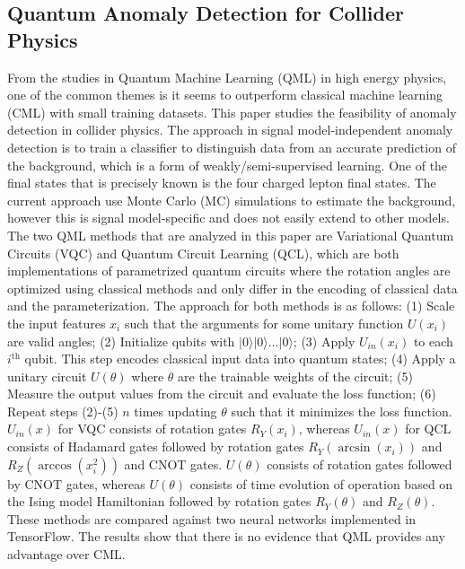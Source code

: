 \subsection{Quantum Anomaly Detection for Collider Physics~\cite{Alvi:2022fkk}}
From the studies in Quantum Machine Learning (QML) in high energy physics, one of the common themes is it seems to outperform classical machine learning (CML) with small training datasets. This paper studies the feasibility of anomaly detection in collider physics. The approach in signal model-independent anomaly detection is to train a classifier to distinguish data from an accurate prediction of the background, which is a form of weakly/semi-supervised learning. One of the final states that is precisely known is the four charged lepton final states. The current approach use Monte Carlo (MC) simulations to estimate the background, however this is signal model-specific and does not easily extend to other models. The two QML methods that are analyzed in this paper are Variational Quantum Circuits (VQC) and Quantum Circuit Learning (QCL), which are both implementations of parametrized quantum circuits where the rotation angles are optimized using classical methods and only differ in the encoding of classical data and the parameterization. The approach for both methods is as follows: (1) Scale the input features $x_{i}$ such that the arguments for some unitary function $U(x_{i})$ are valid angles; (2) Initialize qubits with $ \vert 0 \rangle \vert 0 \rangle \ldots \vert 0 \rangle $; (3) Apply $U_{in}(x_{i})$ to each $i^{\text{th}}$ qubit. This step encodes classical input data into quantum states; (4) Apply a unitary circuit $U(\theta)$ where $\theta$ are the trainable weights of the circuit; (5) Measure the output values from the circuit and evaluate the loss function; (6) Repeat steps (2)-(5) $n$ times updating $\theta$ such that it minimizes the loss function. $U_{in}(x)$ for VQC consists of rotation gates $R_{Y}(x_{i})$, whereas $U_{in}(x)$ for QCL consists of Hadamard gates followed by rotation gates $R_{Y}(\arcsin(x_{i}))$ and $R_{Z}(\arccos(x_{i}^{2}))$ and CNOT gates. $U(\theta)$ consists of rotation gates followed by CNOT gates, whereas $U(\theta)$ consists of time evolution of operation based on the Ising model Hamiltonian followed by rotation gates $R_{Y}(\theta)$ and $R_{Z}(\theta)$. These methods are compared against two neural networks implemented in TensorFlow. The results show that there is no evidence that QML provides any advantage over CML.
